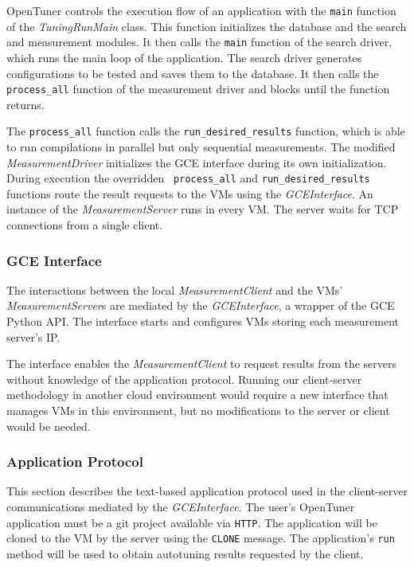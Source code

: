 OpenTuner controls the execution flow of an application with the
\texttt{\footnotesize main} function of the \emph{TuningRunMain} class. This
function initializes the database and the search and measurement modules. It
then calls the \texttt{\footnotesize main} function of the search driver, which
runs the main loop of the application.  The search driver generates
configurations to be tested and saves them to the database. It then calls the
\texttt{\footnotesize process\_all} function of the measurement driver and
blocks until the function returns.

The \texttt{\footnotesize process\_all} function calls the
\texttt{\footnotesize run\_desired\_results} function, which is able to run
compilations in parallel but only sequential measurements.  The modified
\emph{MeasurementDriver} initializes the GCE interface during its own
initialization. During execution the overridden \texttt{\footnotesize
process\_all} and \texttt{\footnotesize run\_desired\_results} functions route
the result requests to the VMs using the \emph{GCEInterface}.  An instance of
the \emph{MeasurementServer} runs in every VM. The server waits for TCP
connections from a single client.

\subsubsection{GCE Interface}
\label{sec:gce}

The interactions between the local \emph{MeasurementClient} and the VMs'
\emph{MeasurementServer}s are mediated by the \emph{GCEInterface}, a wrapper of
the GCE Python API.  The interface starts and configures VMs storing each
measurement server's IP.

The interface enables the \emph{MeasurementClient} to request results from the
servers without knowledge of the application protocol. Running our
client-server methodology in another cloud environment would require a new
interface that manages VMs in this environment, but no modifications to the
server or client would be needed.

\subsubsection{Application Protocol}
\label{sec:app}

This section describes the text-based application protocol used in the
client-server communications mediated by the \emph{GCEInterface}. The user's
OpenTuner application must be a git project available via
\texttt{\footnotesize{HTTP}}. The application will be cloned to the VM by the
server using the \texttt{\footnotesize CLONE} message.  The application's
\texttt{\footnotesize run} method will be used to obtain autotuning results
requested by the client.

